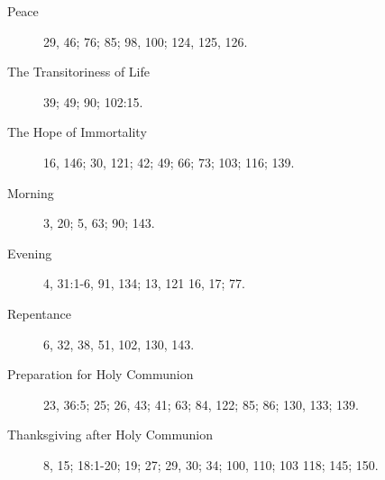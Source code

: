 \begin{description}
	\item[Peace] 29, 46; 76; 85; 98, 100; 124, 125, 126.
	\item[The Transitoriness of Life] 39; 49; 90; 102:15.
	\item[The Hope of Immortality] 16, 146; 30, 121; 42; 49; 66; 73; 103; 116; 139.
	\item[Morning] 3, 20; 5, 63; 90; 143.
	\item[Evening] 4, 31:1-6, 91, 134; 13, 121 16, 17; 77.
	\item[Repentance] 6, 32, 38, 51, 102, 130, 143.
	\item[Preparation for Holy Communion] 23, 36:5; 25; 26, 43; 41; 63; 84, 122; 85; 86; 130, 133; 139.
	\item[Thanksgiving after Holy Communion] 8, 15; 18:1-20; 19; 27; 29, 30; 34; 100, 110; 103 118; 145; 150.
\end{description}